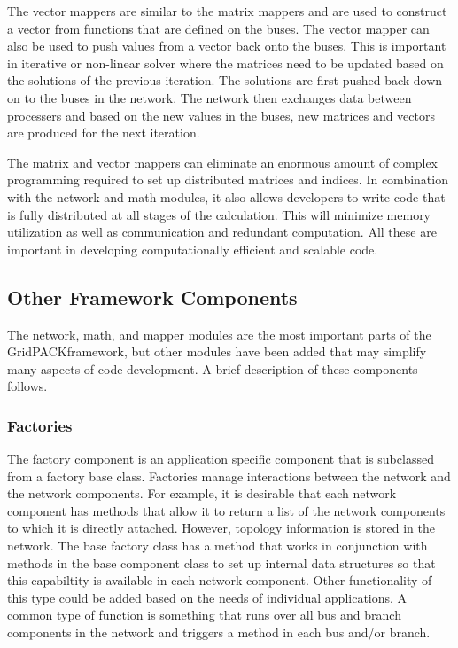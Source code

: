 \documentclass[preprint]{acm_proc_article-sp}
\begin{document}
The vector mappers are similar to the matrix mappers and are used to
construct a vector from functions
that are defined on the buses. The vector mapper can also be used to push values
from a vector back onto the buses. This is important in iterative or non-linear
solver where the matrices need to be updated based on the solutions of the
previous iteration. The solutions are first pushed back down on to the buses in the
network. The network then exchanges data between processers and based on the new
values in the buses, new matrices and vectors are produced for the next
iteration.

The matrix and vector mappers can eliminate an enormous amount of complex
programming required to set up distributed matrices and indices. In combination
with the network and math modules, it also allows developers to write code that
is fully distributed at all stages of the calculation. This will minimize memory
utilization as well as communication and redundant computation. All these are
important in developing computationally efficient and scalable code.

\subsection{Other Framework Components}
The network, math, and mapper modules are the most important parts of the
GridPACK\texttrademark framework, but other modules have been added that may
simplify many aspects of code development. A brief description of these
components follows.

\subsubsection{Factories}
The factory component is an application specific component that is subclassed
from a factory base class. Factories manage interactions between the network and
the network components. For example, it is desirable that each network component has
methods that allow it to return a list of the network components to which it is
directly attached. However, topology information is stored in the network. The
base factory class has a method that works in conjunction with methods in the base
component class to set up internal data structures so that this capabiltity is
available in each network component. Other functionality of this type could be
added based on the needs of individual applications. A common type of function
is something that runs over all bus and branch components in the network and
triggers a method in each bus and/or branch.
\end{document}
